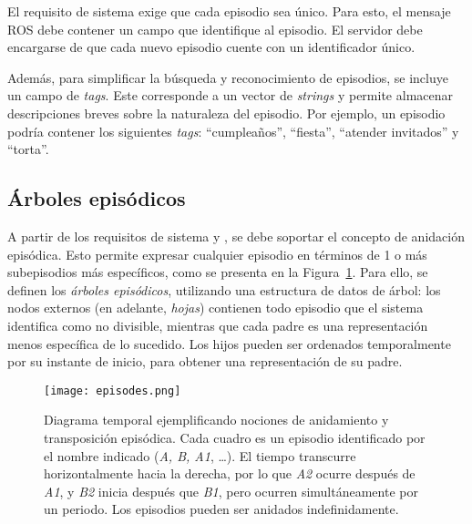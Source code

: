 El requisito de sistema  exige que cada episodio sea único. Para esto, el mensaje ROS debe contener un campo que identifique al episodio. El servidor debe encargarse de que cada nuevo episodio cuente con un identificador único.

Además, para simplificar la búsqueda y reconocimiento de episodios, se incluye un campo de \textit{tags}. Este corresponde a un vector de \textit{strings} y permite almacenar descripciones breves sobre la naturaleza del episodio. Por ejemplo, un episodio podría contener los siguientes \textit{tags}: ``cumpleaños'', ``fiesta'', ``atender invitados'' y ``torta''.

 
\subsection{Árboles episódicos}

A partir de los requisitos de sistema  y , se debe soportar el concepto de anidación episódica. Esto permite expresar cualquier episodio en términos de 1 o más subepisodios más específicos, como se presenta en la Figura~\ref{img:episodes}. Para ello, se definen los \textit{árboles episódicos}, utilizando una estructura de datos de árbol: los nodos externos (en adelante, \textit{hojas}) contienen todo episodio que el sistema identifica como no divisible, mientras que cada padre es una representación menos específica de lo sucedido. Los hijos pueden ser ordenados temporalmente por su instante de inicio, para obtener una representación de su padre.

\begin{figure}[!ht]
	\centering
	\texttt{[image: episodes.png]}
	\caption[Concepto de anidamiento y transposición episódica.]
	{\small Diagrama temporal ejemplificando nociones de anidamiento y transposición episódica. Cada cuadro es un episodio identificado por el nombre indicado (\textit{A, B, A1}, \ldots). El tiempo transcurre horizontalmente hacia la derecha, por lo que \textit{A2} ocurre después de \textit{A1}, y \textit{B2} inicia después que \textit{B1}, pero ocurren simultáneamente por un periodo. Los episodios pueden ser anidados indefinidamente.}
	\label{img:episodes}
\end{figure}

